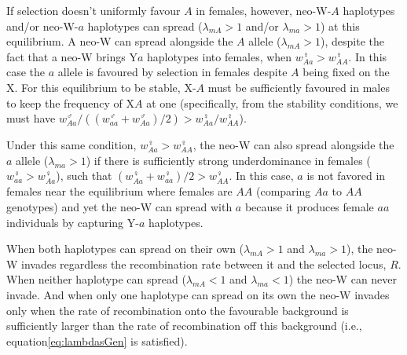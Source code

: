 \documentclass[12pt]{article}
\begin{document}
If selection doesn't uniformly favour $A$ in females, however, neo-W-$A$ haplotypes and/or neo-W-$a$ haplotypes can spread ($\lambda_{mA}>1$ and/or $\lambda_{ma}>1$) at this equilibrium.
A neo-W can spread alongside the $A$ allele ($\lambda_{mA}>1$), despite the fact that a neo-W brings Y$a$ haplotypes into females, when $w_{Aa}^\female>w_{AA}^\female$.
In this case the $a$ allele is favoured by selection in females despite $A$ being fixed on the X.
For this equilibrium to be stable, X-$A$ must be sufficiently favoured in males to keep the frequency of X$A$ at one (specifically, from the stability conditions, we must have $w_{Aa}^\male/((w_{aa}^\male+w_{Aa}^\male)/2)>w_{Aa}^\female/w_{AA}^\female$).

Under this same condition, $w_{Aa}^\female>w_{AA}^\female$, the neo-W can also spread alongside the $a$ allele ($\lambda_{ma}>1$) if there is sufficiently strong underdominance in females ($w_{aa}^\female>w_{Aa}^\female$), such that $(w_{Aa}^\female+w_{aa}^\female)/2>w_{AA}^\female$.  
In this case, $a$ is not favored in females near the equilibrium where females are $AA$ (comparing $Aa$ to $AA$ genotypes) and yet the neo-W can spread with $a$ because it produces female $aa$ individuals by capturing Y-$a$ haplotypes.

When both haplotypes can spread on their own ($\lambda_{mA}>1$ and $\lambda_{ma}>1$), the neo-W invades regardless the recombination rate between it and the selected locus, $R$.
When neither haplotype can spread ($\lambda_{mA}<1$ and $\lambda_{ma}<1$) the neo-W can never invade.
And when only one haplotype can spread on its own the neo-W invades only when the rate of recombination onto the favourable background is sufficiently larger than the rate of recombination off this background (i.e., equation\ref{eq:lambdasGen} is satisfied).

\end{document}
